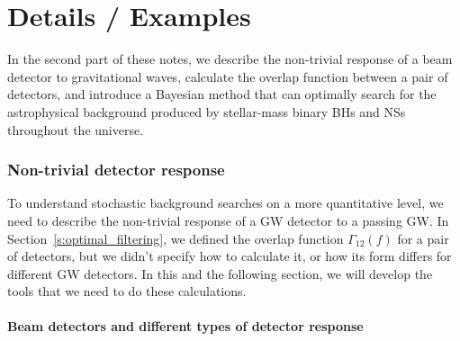 \part{Details / Examples}
\label{p:details}

In the second part of these notes, 
we describe the non-trivial response of a beam
detector to gravitational waves, calculate the overlap function
between a pair of detectors, and introduce a Bayesian method that
can optimally search for the astrophysical background 
produced by stellar-mass
binary BHs and NSs throughout the universe.

\section{Non-trivial detector response}
\label{s:nontrivial_response}

To understand stochastic background searches on a 
more quantitative level, we need to describe the 
non-trivial response of a GW detector to a passing GW.
In Section~\ref{s:optimal_filtering}, we defined the 
overlap function $\Gamma_{12}(f)$
for a pair of detectors, but we didn't specify how 
to calculate it, or how its form differs for different
GW detectors.
In this and the following section, we will develop
the tools that we need to do these calculations.

\subsection{Beam detectors and different types of 
detector response}

